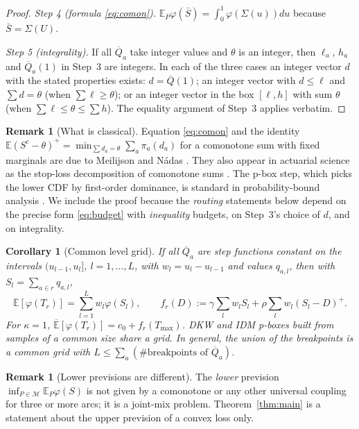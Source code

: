 \documentclass[11pt]{article}
\newtheorem{corollary}[theorem]{Corollary}
\theoremstyle{definition}
\newtheorem{remark}[theorem]{Remark}
\newcommand{\E}{\mathbb{E}}
\newcommand{\Eu}{\overline{\mathbb{E}}}
\newcommand{\Qb}{\overline{Q}}
\newcommand{\cM}{\mathcal{M}}
\newcommand{\pos}[1]{\left(#1\right)^{+}}
\begin{document}
\begin{proof}
\emph{Step 4 (formula \eqref{eq:comon}).} $\E_{\bar P}\varphi(\bar S)=\int_0^1\varphi(\Sigma(u))du$ because $\bar S=\Sigma(U)$.

\emph{Step 5 (integrality).} If all $\Qb_a$ take integer values and $\theta$ is an integer, then $\ell_a$, $h_a$ and $\Qb_a(1)$ in Step~3 are integers. In each of the three cases an integer vector $d$ with the stated properties exists: $d=\Qb(1)$; an integer vector with $d\le\ell$ and $\sum d=\theta$ (when $\sum\ell\ge\theta$); or an integer vector in the box $[\ell,h]$ with sum $\theta$ (when $\sum\ell\le\theta\le\sum h$). The equality argument of Step~3 applies verbatim.
\end{proof}

\begin{remark}[What is classical]
Equation \eqref{eq:comon} and the identity $\E\pos{S^c-\theta}=\min_{\sum d_a=\theta}\sum_a\pi_a(d_a)$ for a comonotone sum with fixed marginals are due to Meilijson and N\'adas \cite{MN79}. They also appear in actuarial science as the stop-loss decomposition of comonotone sums \cite{KDG00,DDGKV02}. The p-box step, which picks the lower CDF by first-order dominance, is standard in probability-bound analysis \cite{WD90,Ferson03}. We include the proof because the \emph{routing} statements below depend on the precise form \eqref{eq:budget} with \emph{inequality} budgets, on Step~3's choice of $d$, and on integrality.
\end{remark}

\begin{corollary}[Common level grid]\label{cor:grid}
If all $\Qb_a$ are step functions constant on the intervals $(u_{l-1},u_l]$, $l=1,\dots,L$, with $w_l=u_l-u_{l-1}$ and values $q_{a,l}$, then with $S_l=\sum_{a\in r}q_{a,l}$,
\[
\Eu[\varphi(T_r)]=\sum_{l=1}^{L}w_l\varphi(S_l),\qquad f_r(D):=\gamma\sum_lw_lS_l+\rho\sum_lw_l\pos{S_l-D}.
\]
For $\kappa=1$, $\Eu[\varphi(T_r)]=c_0+f_r(T_{\max})$. DKW and IDM p-boxes built from samples of a common size share a grid. In general, the union of the breakpoints is a common grid with $L\le\sum_a(\#\text{breakpoints of }\Qb_a)$.
\end{corollary}

\begin{remark}[Lower previsions are different]
The \emph{lower} prevision $\inf_{P\in\cM}\E_P\varphi(S)$ is not given by a comonotone or any other universal coupling for three or more arcs; it is a joint-mix problem. Theorem~\ref{thm:main} is a statement about the upper prevision of a convex loss only.
\end{remark}
\end{document}
